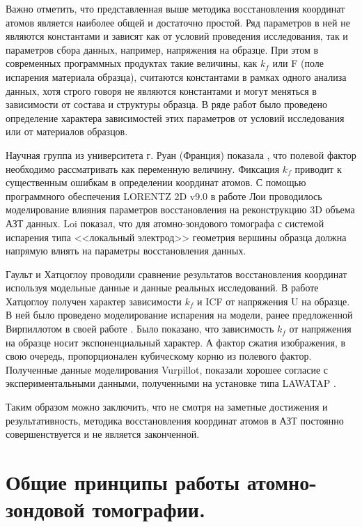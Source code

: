 Важно отметить, что представленная выше методика восстановления координат атомов является наиболее общей и достаточно простой. Ряд параметров в ней не являются константами и зависят как от условий проведения исследования, так и параметров сбора данных, например, напряжения на образце. При этом в современных программных продуктах такие величины, как $k_f$ или F (поле испарения материала образца), считаются константами в рамках одного анализа данных, хотя строго говоря не являются константами и могут меняться в зависимости от состава и структуры образца. В ряде работ было проведено определение характера зависимостей этих параметров от условий исследования или от материалов образцов.

Научная группа из университета г. Руан (Франция) показала \cite{Gault11_Loi}, что полевой фактор необходимо рассматривать как переменную величину. Фиксация $k_f$ приводит к существенным ошибкам в определении координат атомов. С помощью программного обеспечения LORENTZ 2D v9.0 \cite{Asi02} в работе Лои \cite{Loi13} проводилось моделирование влияния параметров восстановления на реконструкцию 3D объема АЗТ данных. Loi показал, что для атомно-зондового томографа с системой испарения типа <<локальный электрод>> геометрия вершины образца должна напрямую влиять на параметры восстановления данных.

Гаульт \cite{Gault11_Loi} и Хатцоглоу \cite{Hatzoglou19} проводили сравнение результатов восстановления координат используя модельные данные и данные реальных исследований. В работе Хатцоглоу \cite{Hatzoglou19} получен характер зависимости $k_f$ и ICF от напряжения U на образце. В ней было проведено моделирование испарения на модели, ранее предложенной Вирпиллотом в своей работе \cite{Vurpillot13}. Было показано, что зависимость $k_f$ от напряжения на образце носит экспоненциальный характер. А фактор сжатия изображения, в свою очередь, пропорционален кубическому корню из полевого фактор. Полученные данные моделирования Vurpillot, показали хорошее согласие с экспериментальными данными, полученными на установке типа LAWATAP \cite{Vurpillot13}.

Таким образом можно заключить, что не смотря на заметные достижения и результативность, методика восстановления координат атомов в АЗТ постоянно совершенствуется и не является законченной. 


\FloatBarrier

\section{Общие принципы работы атомно-зондовой томографии.}\label{sec:ch1/sec4}

